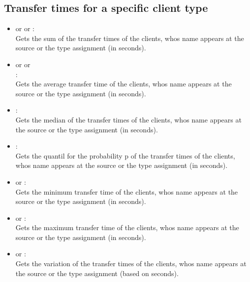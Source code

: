 \subsection{Transfer times for a specific client type}

\begin{itemize}

\item
{} or  or :\\
Gets the sum of the transfer times of the clients, whos name appears at the source or the type assignment  (in seconds).

\item
{} or  or\\
:\\
Gets the average transfer time of the clients, whos name appears at the source or the type assignment  (in seconds).

\item
{}:\\
Gets the median of the transfer times of the clients, whos name appears at the source or the type assignment  (in seconds).

\item
{}:\\
Gets the quantil for the probability p of the transfer times of the clients, whos name appears at the source or the type assignment  (in seconds).

\item
{} or :\\
Gets the minimum transfer time of the clients, whos name appears at the source or the type assignment  (in seconds).

\item
{} or :\\
Gets the maximum transfer time of the clients, whos name appears at the source or the type assignment  (in seconds).

\item
{} or :\\
Gets the variation of the transfer times of the clients, whos name appears at the source or the type assignment  (based on seconds).


\end{itemize}
